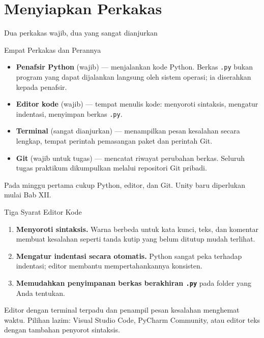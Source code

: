 \documentclass[aspectratio=169,10pt]{beamer}
\begin{document}
\section{Menyiapkan Perkakas}
  {Dua perkakas wajib, dua yang sangat dianjurkan}

\begin{frame}{Empat Perkakas dan Perannya}
\begin{itemize}
  \item \textbf{Penafsir Python} (wajib) --- menjalankan kode Python. Berkas
        \texttt{.py} bukan program yang dapat dijalankan langsung oleh sistem
        operasi; ia diserahkan kepada penafsir.
  \item \textbf{Editor kode} (wajib) --- tempat menulis kode: menyoroti
        sintaksis, mengatur indentasi, menyimpan berkas \texttt{.py}.
  \item \textbf{Terminal} (sangat dianjurkan) --- menampilkan pesan kesalahan
        secara lengkap, tempat perintah pemasangan paket dan perintah Git.
  \item \textbf{Git} (wajib untuk tugas) --- mencatat riwayat perubahan berkas.
        Seluruh tugas praktikum dikumpulkan melalui repositori Git pribadi.
\end{itemize}
\vspace{0.2cm}
\begin{kotak}
Pada minggu pertama cukup Python, editor, dan Git. Unity baru diperlukan mulai
Bab XII.
\end{kotak}
\end{frame}

\begin{frame}{Tiga Syarat Editor Kode}
\begin{enumerate}
  \item \textbf{Menyoroti sintaksis.} Warna berbeda untuk kata kunci, teks, dan
        komentar membuat kesalahan seperti tanda kutip yang belum ditutup mudah
        terlihat.
  \item \textbf{Mengatur indentasi secara otomatis.} Python sangat peka terhadap
        indentasi; editor membantu mempertahankannya konsisten.
  \item \textbf{Memudahkan penyimpanan berkas berakhiran \texttt{.py}} pada
        folder yang Anda tentukan.
\end{enumerate}
\vspace{0.2cm}
\begin{kiat}
Editor dengan terminal terpadu dan penampil pesan kesalahan menghemat waktu.
Pilihan lazim: Visual Studio Code, PyCharm Community, atau editor teks dengan
tambahan penyorot sintaksis.
\end{kiat}
\end{frame}
\end{document}
